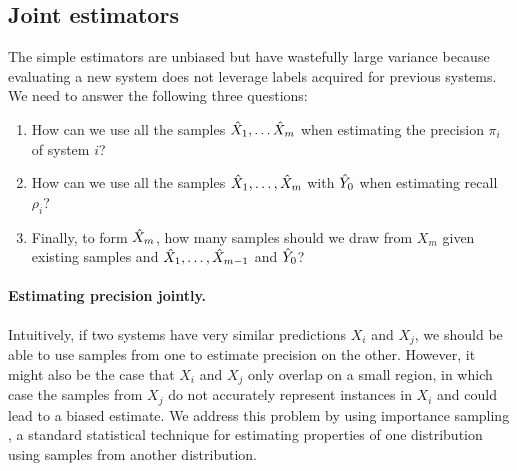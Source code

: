 \subsection{Joint estimators}
The simple estimators are unbiased but have wastefully large variance
because evaluating a new system does not leverage labels acquired for previous
systems.
We need to answer the following three questions:
\begin{enumerate}
  \item How can we use all the samples ${\hat{X}}_1, \ldots {\hat{X}}_m$ when estimating the precision $\pi_i$ of system $i$?
  \item How can we use all the samples ${\hat{X}}_1, \ldots, {\hat{X}}_m$ with ${\hat{Y}}_0$ when estimating recall $\rho_i$?
  \item Finally, to form ${\hat{X}}_m$, how many samples should we draw from $X_m$ given existing samples and ${\hat{X}}_1, \ldots, {\hat{X}}_{m-1}$ and ${\hat{Y}}_0$?
\end{enumerate}
%
%
%

\paragraph{Estimating precision jointly.}
Intuitively, if two systems have very similar predictions $X_i$ and $X_j$, we should be able to use samples from one to estimate precision on the other.
However, it might also be the case that $X_i$ and $X_j$ only overlap on a small region, in which case the samples from $X_j$ do not accurately represent instances in $X_i$ and could lead to a biased estimate.
We address this problem by using importance sampling \citep{owen2013monte}, a standard statistical technique for estimating properties of one distribution using samples from another distribution.

